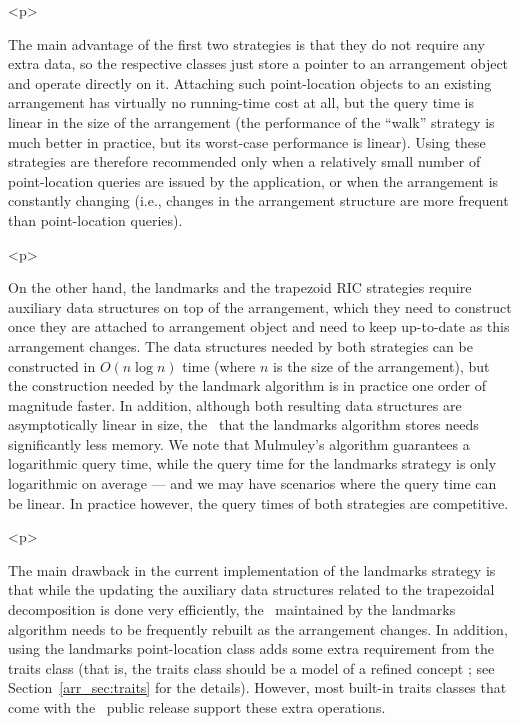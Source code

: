 \begin{ccHtmlOnly}<p>\end{ccHtmlOnly}
The main advantage of the first two strategies is that they do not
require any extra data, so the respective classes just store a
pointer to an arrangement object and operate directly on it.
Attaching such point-location objects to an existing arrangement
has virtually no running-time cost at all, but the query time is
linear in the size of the arrangement (the performance of the
``walk'' strategy is much better in practice, but its worst-case
performance is linear). Using these strategies are therefore
recommended only when a relatively small number of point-location
queries are issued by the application, or when the arrangement is
constantly changing (i.e., changes in the arrangement structure
are more frequent than point-location queries).

\begin{ccHtmlOnly}<p>\end{ccHtmlOnly}
On the other hand, the landmarks and the trapezoid RIC strategies
require auxiliary data structures on top of the arrangement, which
they need to construct once they are attached to arrangement
object and need to keep up-to-date as this arrangement changes.
The data structures needed by both strategies can be constructed
in $O(n \log n)$ time (where $n$ is the size of the arrangement),
but the construction needed by the landmark algorithm is in
practice one order of magnitude faster. In addition, although both
resulting data structures are asymptotically linear in size, the
\kdtree\ that the landmarks algorithm stores needs significantly
less memory. We note that Mulmuley's algorithm guarantees a
logarithmic query time, while the query time for the landmarks
strategy is only logarithmic on average --- and we may have
scenarios where the query time can be linear. In practice however,
the query times of both strategies are competitive.

\begin{ccHtmlOnly}<p>\end{ccHtmlOnly}
The main drawback in the current implementation of the landmarks
strategy is that while the updating the auxiliary data structures
related to the trapezoidal decomposition is done very efficiently,
the \kdtree\ maintained by the landmarks algorithm needs to be
frequently rebuilt as the arrangement changes. In addition, using
the landmarks point-location class adds some extra requirement
from the traits class (that is, the traits class should be a model
of a refined concept ; see
Section~\ref{arr_sec:traits} for the details). However, most
built-in traits classes that come with the \cgal\ public release
support these extra operations.

